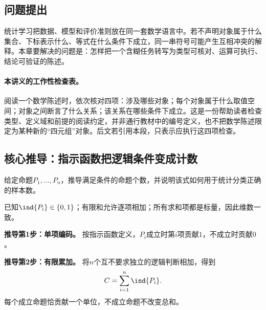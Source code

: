 \subsection*{问题提出}\label{schema:V1-C01:CH-06}
统计学习把数据、模型和评价准则放在同一套数学语言中。若不声明对象属于什么集合、下标表示什么、等式在什么条件下成立，同一串符号可能产生互相冲突的解释。本章要解决的问题是：怎样把一个含糊任务转写为类型可核对、运算可执行、结论可验证的陈述。

\label{def:V1-C01-statement}\label{schema:V1-C01:CH-07}
\paragraph{本讲义的工作性检查表。}
阅读一个数学陈述时，依次核对四项：涉及哪些对象；每个对象属于什么取值空间；对象之间断言了什么关系；该关系在哪些条件下成立。这是一份帮助读者检查类型、定义域和前提的阅读约定，并非通行教材中的编号定义，也不把数学陈述限定为某种新的“四元组”对象。后文若引用本段，只表示应执行这四项检查。

\label{schema:V1-C01:CH-08}
\label{schema:V1-C01:CH-09}
\label{schema:V1-C01:CH-10}

\subsection*{核心推导：指示函数把逻辑条件变成计数}

\begin{derivationgoalbox}\label{schema:V1-C01:CH-11}
给定命题$P_1,\ldots,P_n$，推导满足条件的命题个数，并说明该式如何用于统计分类正确的样本数。
\end{derivationgoalbox}
\begin{derivationprepbox}
已知$\ind\{P_i\}\in\{0,1\}$；有限和允许逐项相加；所有求和项都是标量，因此维数一致。
\end{derivationprepbox}
\textbf{推导第1步：单项编码。} 按指示函数定义，$P_i$成立时第$i$项贡献$1$，不成立时贡献$0$。

\textbf{推导第2步：有限累加。} 将$n$个互不要求独立的逻辑判断相加，得到
\[
C=\sum_{i=1}^{n}\ind\{P_i\}.
\]
每个成立命题恰贡献一个单位，不成立命题不改变总和。

